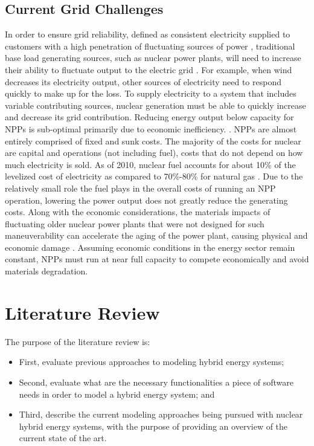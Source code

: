 \documentclass[12pt]{UIdahoMastersThesis}
\begin{document}
\section{Current Grid Challenges}
In order to ensure grid reliability, defined as consistent electricity supplied to customers with a high penetration of fluctuating sources of power , traditional base load generating sources, such as nuclear power plants, will need to increase their ability to fluctuate output to the electric grid \cite {Denholm2011}. For example, when wind decreases its electricity output, other sources of electricity need to respond quickly to make up for the loss. To supply electricity to a system that includes variable contributing sources, nuclear generation must be able to quickly increase and decrease its grid contribution. 
Reducing energy output below capacity for NPPs is sub-optimal primarily due to economic inefficiency.  \cite{Nuclear2011}. NPPs are almost entirely comprised of fixed and sunk costs. The majority of the costs for nuclear are capital and operations (not including fuel), costs that do not depend on how much electricity is sold. As of 2010, nuclear fuel accounts for about 10\% of the levelized cost of electricity as compared to 70\%-80\% for natural gas \cite{IEA/NEA}. Due to the relatively small role the fuel plays in the overall costs of running an NPP operation, lowering the power output does not greatly reduce the generating costs. Along with the economic considerations, the materials impacts  of fluctuating older nuclear power plants that were not designed for such maneuverability can accelerate the aging of the power plant, causing physical and economic damage \cite{Nuclear2011}. Assuming economic conditions in the energy sector remain constant, NPPs must run at near full capacity to compete economically and avoid materials degradation.
\chapter{Literature Review}
The purpose of the literature review is:
\begin{itemize}
\item First, evaluate previous approaches to modeling hybrid energy systems;
\item Second, evaluate what are the necessary functionalities a piece of software needs in order to model a hybrid energy system; and
\item Third, describe the current modeling approaches being pursued with nuclear hybrid energy systems, with the purpose of providing an overview of the current state of the art.
\end{itemize}
	 
\end{document}
